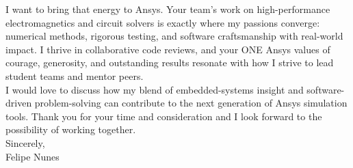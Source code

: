 \documentclass[letterpaper,11pt]{article}
\begin{document}
\begin{flushleft}
		I want to bring that energy to Ansys. Your team’s work on high-performance electromagnetics and circuit solvers is exactly where my passions converge: numerical methods, rigorous testing, and software craftsmanship with real-world impact. I thrive in collaborative code reviews, and your ONE Ansys values of courage, generosity, and outstanding results resonate with how I strive to lead student teams and mentor peers.\\[12pt]
		
		I would love to discuss how my blend of embedded-systems insight and software-driven problem-solving can contribute to the next generation of Ansys simulation tools. Thank you for your time and consideration and I look forward to the possibility of working together.\\[24pt]
		
		Sincerely,\\
		Felipe Nunes
	\end{flushleft}
	
\end{document}
